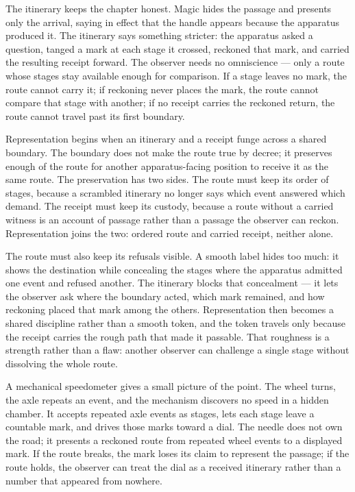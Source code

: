 The itinerary keeps the chapter honest. Magic hides the passage and presents only the arrival, saying in effect that the handle appears because the apparatus produced it. The itinerary says something stricter: the apparatus asked a question, tanged a mark at each stage it crossed, reckoned that mark, and carried the resulting receipt forward. The observer needs no omniscience --- only a route whose stages stay available enough for comparison. If a stage leaves no mark, the route cannot carry it; if reckoning never places the mark, the route cannot compare that stage with another; if no receipt carries the reckoned return, the route cannot travel past its first boundary.

Representation begins when an itinerary and a receipt funge across a shared boundary. The boundary does not make the route true by decree; it preserves enough of the route for another apparatus-facing position to receive it as the same route. The preservation has two sides. The route must keep its order of stages, because a scrambled itinerary no longer says which event answered which demand. The receipt must keep its custody, because a route without a carried witness is an account of passage rather than a passage the observer can reckon. Representation joins the two: ordered route and carried receipt, neither alone.

The route must also keep its refusals visible. A smooth label hides too much: it shows the destination while concealing the stages where the apparatus admitted one event and refused another. The itinerary blocks that concealment --- it lets the observer ask where the boundary acted, which mark remained, and how reckoning placed that mark among the others. Representation then becomes a shared discipline rather than a smooth token, and the token travels only because the receipt carries the rough path that made it passable. That roughness is a strength rather than a flaw: another observer can challenge a single stage without dissolving the whole route.

A mechanical speedometer gives a small picture of the point. The wheel turns, the axle repeats an event, and the mechanism discovers no speed in a hidden chamber. It accepts repeated axle events as stages, lets each stage leave a countable mark, and drives those marks toward a dial. The needle does not own the road; it presents a reckoned route from repeated wheel events to a displayed mark. If the route breaks, the mark loses its claim to represent the passage; if the route holds, the observer can treat the dial as a received itinerary rather than a number that appeared from nowhere.

